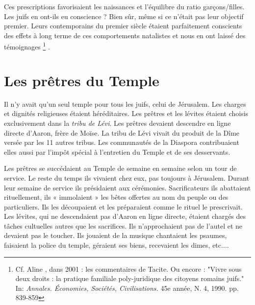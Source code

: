  Ces prescriptions favorisaient les naissances et l'équilibre du ratio garçons/filles. Les juifs en ont-ils eu conscience ? Bien sûr, même si ce n'était pas leur objectif premier. Leurs contemporains du premier siècle étaient parfaitement conscients des effets à long terme de ces comportements natalistes et nous en ont laissé des témoignages%
\footnote{Cf. Aline , dans 2001 : les commentaires de Tacite. Ou encore : "Vivre sous deux droits : la pratique familiale poly-juridique des citoyens romains juifs." In: \emph{Annales. Économies,
Sociétés, Civilisations.} 45e année, N. 4, 1990. pp. 839-859}%
.



\section{Les prêtres du Temple}

 Il n'y avait qu'un seul temple pour tous les juifs, celui de Jérusalem. Les charges et dignités religieuses étaient héréditaires. Les prêtres et les lévites étaient choisis exclusivement dans la \emph{tribu de Lévi}. Les prêtres devaient descendre en ligne directe d'Aaron, frère de Moïse. La tribu de Lévi vivait du produit de la Dîme versée par les 11 autres tribus. Les communautés de la Diaspora contribuaient elles aussi par l'impôt spécial  à l'entretien du Temple et de ses desservants. 

 Les prêtres se succédaient au Temple de semaine en semaine selon un tour de service. Le reste du temps ils vivaient chez eux, pas toujours à Jérusalem. Durant leur semaine de service ils présidaient aux cérémonies. Sacrificateurs ils abattaient rituellement, ils « immolaient » les bêtes offertes au nom du peuple ou des particuliers. Ils les découpaient et les préparaient comme le rituel le prescrivait. 
  Les lévites, qui ne descendaient pas d'Aaron en ligne directe, étaient chargés des tâches cultuelles autres que les sacrifices. Ils n'approchaient pas de l'autel et ne devaient pas le toucher. Ils jouaient de la musique chantaient les psaumes, faisaient la police du temple, géraient ses biens, recevaient les dimes, etc....

